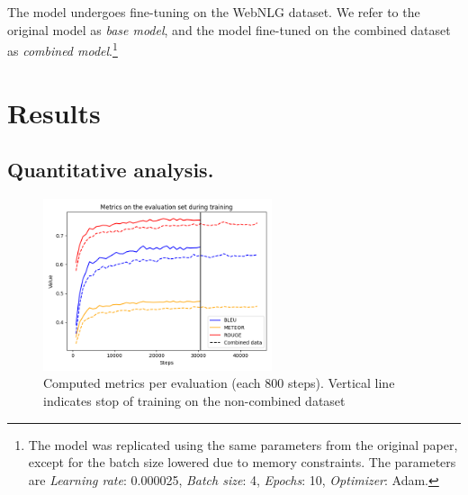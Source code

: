 \documentclass[
hf, %
]{ceurart}
\begin{document}
The model undergoes fine-tuning on the WebNLG dataset. We refer to the original model as \textit{base model}, and the model fine-tuned on the combined dataset as \textit{combined model}.\footnote{The model was replicated using the same parameters from the original paper, except for the batch size lowered due to memory constraints. The parameters are \textit{Learning rate}: 0.000025, \textit{Batch size}: 4, \textit{Epochs}: 10, \textit{Optimizer}: Adam.}

\section{Results}
\label{sec:results_jointGT}

\subsection{Quantitative analysis.}
\begin{figure}[ht] %
    \centering
    \includegraphics[width=0.60\textwidth]{Images/jointGT_training.png}
    \caption{Computed metrics per evaluation (each 800 steps). Vertical line indicates stop of training on the non-combined dataset}
    \label{fig:training_jointgt}
\end{figure}
\end{document}
